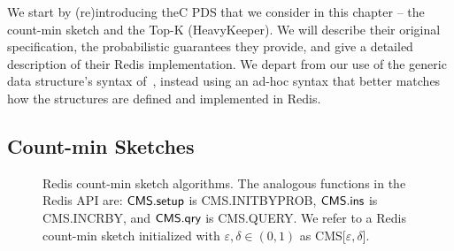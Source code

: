 We start by (re)introducing theC PDS that we consider in this chapter -- the count-min sketch and the Top-K (HeavyKeeper). We will describe their original specification, the probabilistic guarantees they provide, and give a detailed description of their Redis implementation. We depart from our use of the generic data structure's syntax of~\cite{clayton2019}, instead using an ad-hoc syntax that better matches how the structures are defined and implemented in Redis. 

\subsection{Count-min Sketches}
\label{sec:cms-intro}

\begin{figure*}[htp]
    \centering
\begin{pcvstack}[boxed,space=1em]
\begin{pchstack}
    \begin{pcvstack}[space=0.5em]
       \end{pcvstack}
    \begin{pcvstack}[space=0.5em]
    \end{pcvstack}	
\end{pchstack}		
\end{pcvstack}
\caption[The Redis CMS Structure.]{Redis count-min sketch algorithms. 
The analogous functions in the Redis API are: $\textsf{CMS}.\textsf{setup}$ is \textsf{CMS.INITBYPROB}, $\textsf{CMS}.\textsf{ins}$ is \textsf{CMS.INCRBY}, and $\textsf{CMS}.\textsf{qry}$ is \textsf{CMS.QUERY}.
We refer to a Redis count-min sketch initialized with $\varepsilon, \delta \in (0,1)$ as CMS[$\varepsilon, \delta$].} 
\label{fig:redis-cms}
\end{figure*}

